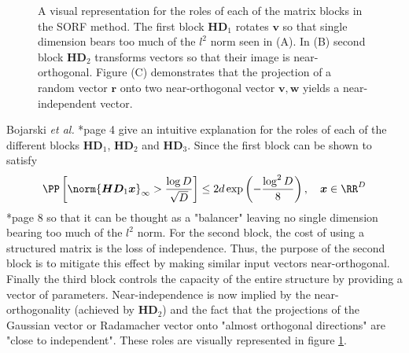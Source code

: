 \begin{figure}[h]
{\begin{adjustbox}{width=0.29\textwidth}
        \end{adjustbox}
    }
    \caption{A visual representation for the roles of each of the matrix blocks in the SORF method. The first block $\bm{H} \bm{D}_1$ rotates $\bm{v}$ so that single dimension bears too much of the $l^2$ norm seen in (A). In (B) second block $\bm{H} \bm{D}_2$ transforms vectors so that their image is near-orthogonal. Figure (C) demonstrates that the projection of a random vector $\bm{r}$ onto two near-orthogonal vector $\bm{v},\bm{w}$ yields a near-independent vector.}
    \label{fig: SORF-vis}
\end{figure}

Bojarski {\it et al.} \cite{BojarskiMariusz2016Saar}*{page 4} give an intuitive explanation for the roles of each of the different blocks $\bm{H} \bm{D}_1$, $\bm{H} \bm{D}_2$ and $\bm{H} \bm{D}_3$. Since the first block can be shown to satisfy
\[
    \PP \left[ \norm{\bm{H}\bm{D}_1 \bm{x}}_{\infty} > \frac{\log D}{\sqrt{D}} \right] \leq 2 d \exp \left( {-\frac{\log^2 D}{8}} \right), \quad \bm{x} \in \RR^D
\]
\cite{LiuFanghui2021RFfK}*{page 8} so that it can be thought as a "balancer" leaving no single dimension bearing too much of the $l^2$ norm. For the second block, the cost of using a structured matrix is the loss of independence. Thus, the purpose of the second block is to mitigate this effect by making similar input vectors near-orthogonal. Finally the third block controls the capacity of the entire structure by providing a vector of parameters. Near-independence is now implied by the near-orthogonality (achieved by $\bm{H} \bm{D}_2$) and the fact that the projections of the Gaussian vector or Radamacher vector onto "almost orthogonal directions" are "close to independent". These roles are visually represented in figure \ref{fig: SORF-vis}.
